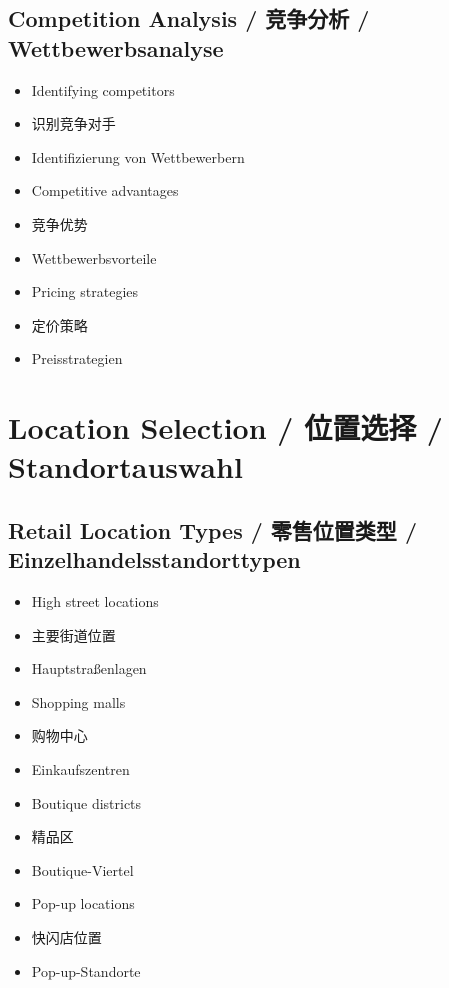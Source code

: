 \subsection{Competition Analysis / 竞争分析 / Wettbewerbsanalyse}
\begin{itemize}
    \item Identifying competitors
    \item 识别竞争对手
    \item Identifizierung von Wettbewerbern
    \item Competitive advantages
    \item 竞争优势
    \item Wettbewerbsvorteile
    \item Pricing strategies
    \item 定价策略
    \item Preisstrategien
\end{itemize}

\section{Location Selection / 位置选择 / Standortauswahl}

\subsection{Retail Location Types / 零售位置类型 / Einzelhandelsstandorttypen}
\begin{itemize}
    \item High street locations
    \item 主要街道位置
    \item Hauptstraßenlagen
    \item Shopping malls
    \item 购物中心
    \item Einkaufszentren
    \item Boutique districts
    \item 精品区
    \item Boutique-Viertel
    \item Pop-up locations
    \item 快闪店位置
    \item Pop-up-Standorte
\end{itemize}

